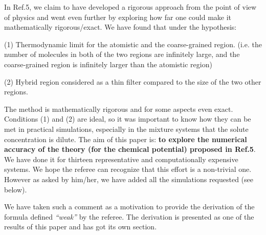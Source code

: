 \documentclass[12pt]{article}
\newcommand{\recheck}[1]{{\color{red} #1}}
\begin{document}
In Ref.5, we claim to have developed a rigorous approach from the
point of view of physics and went even further by exploring how far
one could make it mathematically rigorous/exact. We have found that
under the hypothesis:

(1) Thermodynamic limit for the \recheck{atomistic and the coarse-grained region. (i.e. the number of molecules in both of the two
  regions are infinitely large, and the coarse-grained region is infinitely larger than the atomistic region)}  

(2) Hybrid region considered as a thin filter compared to the size of the two other regions.

The method is mathematically rigorous and for some aspects even
exact. Conditions (1) and (2) are ideal, so it was important to know
how they can be met in \recheck{practical simulations, especially in
the mixture systems that the solute concentration is dilute.} The aim of this paper is: {\bf to
  explore the numerical accuracy of the theory (for the chemical
  potential) proposed in Ref.5}.  We have done it for thirteen
representative and computationally expensive systems.  We hope the
referee can recognize that this effort is a non-trivial one. However
as asked by him/her, we have added all the simulations requested (see
below).

{\color{blue}{\it On the other hand, the paper lacks important pieces of information and many incomplete statements and definitions (see below). There is also a theoretical
    weakness in the sense that the main equation used to evaluate the chem. potential seems to be derived in an ad hoc fashion, and ``proven numerically'', as the authors wrote. It is not easy to rely on an equation/method which lacks a solid theoretical background (mostly in statistical physics)}}

We have taken such a comment as a motivation to \recheck{provide the} derivation of the formula defined {\it ``weak''} by the referee. The derivation is presented as one of the results of this paper and has got its own section.


{\color{blue}{\it (1) A description of the cg model is lacking. Please specify how do you treat and the interaction potential for
cg molecules of solvent and solute. I suppose that both types of molecules (solvent and solute) free to cross the hybrid layer.
Please confirm. Please add a section about the cg model.}}
\end{document}

